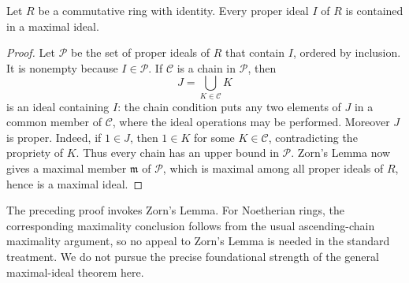 \begin{applicationtheorem}
\label{thm:maximal-ideal-existence}
Let \(R\) be a commutative ring with identity. Every proper ideal \(I\) of
\(R\) is contained in a maximal ideal.
\end{applicationtheorem}
\begin{proof}
Let \(\mathcal P\) be the set of proper ideals of \(R\) that contain \(I\),
ordered by inclusion. It is nonempty because \(I\in\mathcal P\). If
\(\mathcal C\) is a chain in \(\mathcal P\), then
\[
J=\bigcup_{K\in\mathcal C}K
\]
is an ideal containing \(I\): the chain condition puts any two elements of
\(J\) in a common member of \(\mathcal C\), where the ideal operations may
be performed. Moreover \(J\) is proper. Indeed, if \(1\in J\), then
\(1\in K\) for some \(K\in\mathcal C\), contradicting the propriety of
\(K\). Thus every chain has an upper bound in \(\mathcal P\). Zorn's Lemma
now gives a maximal member \(\mathfrak m\) of \(\mathcal P\), which is
maximal among all proper ideals of \(R\), hence is a maximal ideal.
\end{proof}
\begin{unremark}
The preceding proof invokes Zorn's Lemma. For Noetherian rings, the
corresponding maximality conclusion follows from the usual ascending-chain
maximality argument, so no appeal to Zorn's Lemma is needed in the standard
treatment. We do not pursue the precise foundational strength of the general
maximal-ideal theorem here.
\end{unremark}

